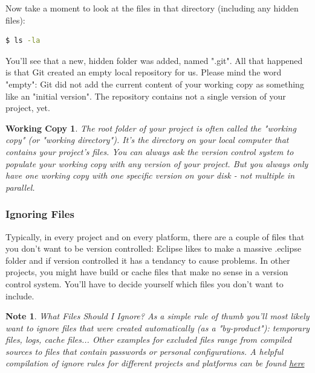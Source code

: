 \documentclass{article}
\begin{document}
Now take a moment to look at the files in that directory (including any hidden files):

\begin{lstlisting}[language=bash]
$ ls -la
\end{lstlisting}

You'll see that a new, hidden folder was added, named ".git". All that happened is that Git created an empty local repository for us. Please mind the word "empty": Git did not add the current content of your working copy as something like an "initial version". The repository contains not a single version of your project, yet.

 \newtheorem*{working-copy}{Working Copy}
 \begin{working-copy}
The root folder of your project is often called the "working copy" (or "working directory"). It's the directory on your local computer that contains your project's files.
\newline\newline
You can always ask the version control system to populate your working copy with any version of your project. But you always only have one working copy with one specific version on your disk - not multiple in parallel.
\end{working-copy}

\subsubsection{Ignoring Files}
Typically, in every project and on every platform, there are a couple of files that you don't want to be version controlled: Eclipse likes to make a massive .eclipse folder and if version controlled it has a tendancy to cause problems. In other projects, you might have build or cache files that make no sense in a version control system. You'll have to decide yourself which files you don't want to include.

 \newtheorem*{note}{Note}
 \begin{note}
What Files Should I Ignore?
\newline\newline
As a simple rule of thumb you'll most likely want to ignore files that were created automatically (as a "by-product"): temporary files, logs, cache files...
\newline\newline
Other examples for excluded files range from compiled sources to files that contain passwords or personal configurations.
\newline\newline
A helpful compilation of ignore rules for different projects and platforms can be found \href{https://www.github.com/github/gitignore}{here} 
 \end{note}
\end{document}
